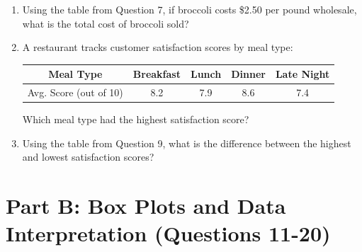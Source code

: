 \documentclass[12pt,a4paper]{article}
\begin{document}
\begin{enumerate}
\item Using the table from Question 7, if broccoli costs \$2.50 per pound wholesale, what is the total cost of broccoli sold?

\item A restaurant tracks customer satisfaction scores by meal type:
\begin{center}
\begin{tabular}{|c|c|c|c|c|}
\hline
Meal Type & Breakfast & Lunch & Dinner & Late Night \\
\hline
Avg. Score (out of 10) & 8.2 & 7.9 & 8.6 & 7.4 \\
\hline
\end{tabular}
\end{center}
Which meal type had the highest satisfaction score?

\item Using the table from Question 9, what is the difference between the highest and lowest satisfaction scores?

\end{enumerate}

\section{Part B: Box Plots and Data Interpretation (Questions 11-20)}
\end{document}
